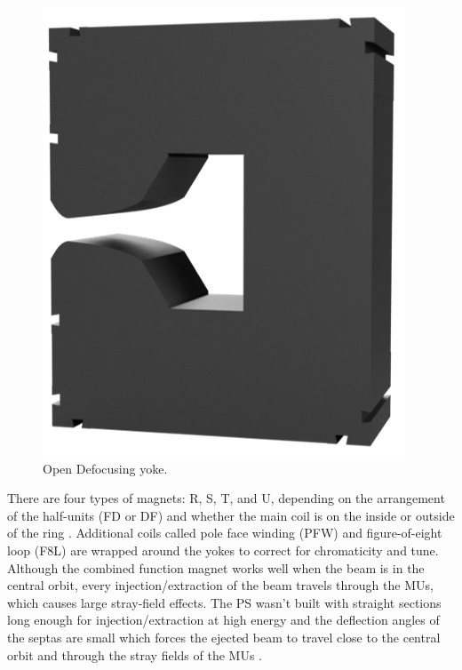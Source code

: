 \documentclass[a4paper,
               biblatex,     %
               keeplastbox,   %
               ]{jacow}
\begin{document}
\begin{figure}[!htb]
  \hfill
  \begin{minipage}[b]{0.45\columnwidth}
    \includegraphics*[width=\textwidth]{MOPOTK030_f2.png}
    \caption{Open Defocusing yoke.}
    \label{fig:defocusing}
  \end{minipage}
\end{figure}

There are four types of magnets: R, S, T, and U, depending on the arrangement of the half-units (FD or DF) and whether the main coil is on the inside or outside of the ring \cite{steerenberg_fifty_2011}. Additional coils called pole face winding (PFW) and figure-of-eight loop (F8L) are wrapped around the yokes to correct for chromaticity and tune. Although the combined function magnet works well when the beam is in the central orbit, every injection/extraction of the beam travels through the MUs, which causes large stray-field effects. The PS wasn't built with straight sections long enough for injection/extraction at high energy and the deflection angles of the septas are small which forces the ejected beam to travel close to the central orbit and through the stray fields of the MUs \cite{risselada_beam_nodate}.
\end{document}
